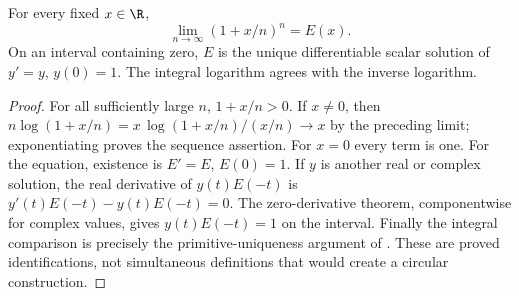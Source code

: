 \begin{theorem}
For every fixed $x\in\R$,
\[\lim_{n\to\infty}(1+x/n)^n=E(x).
\]
On an interval containing zero, $E$ is the unique differentiable scalar
solution of $y'=y$, $y(0)=1$. The integral logarithm agrees with the
inverse logarithm.
\end{theorem}
\begin{proof}
For all sufficiently large $n$, $1+x/n>0$. If $x\ne0$, then
$n\log(1+x/n)=x\,\log(1+x/n)/(x/n)\to x$ by the preceding limit;
exponentiating proves the sequence assertion. For $x=0$ every term is one.
For the equation, existence is $E'=E$, $E(0)=1$. If $y$ is another
real or complex solution, the real derivative of $y(t)E(-t)$ is
$y'(t)E(-t)-y(t)E(-t)=0$. The zero-derivative theorem, componentwise
for complex values, gives $y(t)E(-t)=1$ on the interval.
Finally the integral comparison is precisely the primitive-uniqueness
argument of . These are proved identifications,
not simultaneous definitions that would create a circular construction.
\end{proof}
